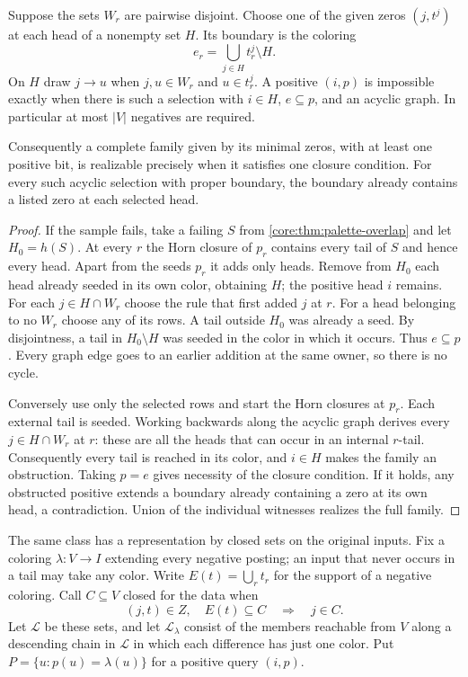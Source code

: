 \begin{corollary}
\label{core:cor:palette-boundary}
Suppose the sets $W_r$ are pairwise disjoint. Choose one of the given
zeros $(j,t^j)$ at each head of a nonempty set $H$. Its boundary is
the coloring
\[
 e_r=\bigcup_{j\in H}t^j_r\setminus H .
\]
On $H$ draw $j\to u$ when $j,u\in W_r$ and $u\in t^j_r$.
A positive $(i,p)$ is impossible exactly when there is such a
selection with $i\in H$, $e\subseteq p$, and an acyclic graph.
In particular at most $|V|$ negatives are required.

Consequently a complete family given by its minimal zeros, with at
least one positive bit, is realizable precisely when it satisfies one
closure condition. For every such acyclic selection with proper
boundary, the boundary already contains a listed zero at each selected
head.
\end{corollary}
\begin{proof}
If the sample fails, take a failing $S$ from
\cref{core:thm:palette-overlap} and let $H_0=h(S)$. At every $r$
the Horn closure of $p_r$ contains every tail of $S$ and hence every
head. Apart from the seeds $p_r$ it adds only heads. Remove from
$H_0$ each head already seeded in its own color, obtaining $H$;
the positive head $i$ remains. For each $j\in H\cap W_r$ choose
the rule that first added $j$ at $r$. For a head belonging to no
$W_r$ choose any of its rows. A tail outside $H_0$ was already a
seed. By disjointness, a tail in $H_0\setminus H$ was seeded in the
color in which it occurs. Thus $e\subseteq p$. Every graph edge
goes to an earlier addition at the same owner, so there is no cycle.

Conversely use only the selected rows and start the Horn closures at
$p_r$. Each external tail is seeded. Working backwards along the
acyclic graph derives every $j\in H\cap W_r$ at $r$: these are all
the heads that can occur in an internal $r$-tail. Consequently every
tail is reached in its color, and $i\in H$ makes the family an
obstruction. Taking $p=e$ gives necessity of the closure condition.
If it holds, any obstructed positive extends a boundary already
containing a zero at its own head, a contradiction. Union of the
individual witnesses realizes the full family.
\end{proof}
The same class has a representation by closed sets on the original
inputs. Fix a coloring $\lambda:V\to I$ extending every negative
posting; an input that never occurs in a tail may take any color.
Write $E(t)=\bigcup_r t_r$ for the support of a negative coloring.
Call $C\subseteq V$ closed for the data when
\[
   (j,t)\in Z,\quad E(t)\subseteq C\quad\Longrightarrow\quad j\in C .
\]
Let $\mathcal L$ be these sets, and let $\mathcal L_\lambda$ consist
of the members reachable from $V$ along a descending chain in
$\mathcal L$ in which each difference has just one color. Put
$P=\{u:p(u)=\lambda(u)\}$ for a positive query $(i,p)$.

